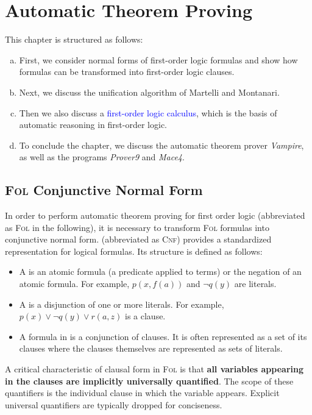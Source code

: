 \chapter{Automatic Theorem Proving}
This chapter is structured as follows:
\begin{enumerate}[(a)]
\item First, we consider normal forms of first-order logic formulas and show how formulas
      can be transformed into first-order logic clauses.
\item Next, we discuss the unification algorithm of Martelli and Montanari.
\item Then we also discuss a \textcolor{blue}{first-order logic calculus}, which is the basis
      of automatic reasoning in first-order logic.
\item To conclude the chapter, we discuss the automatic theorem prover \textsl{Vampire}, as well as
      the programs \textsl{Prover9} and \textsl{Mace4}.
\end{enumerate}

\section{\textsc{Fol} Conjunctive Normal Form}
In order to perform automatic theorem proving for first order logic (abbreviated as \textsc{Fol} in the
following), it is necessary to transform \textsc{Fol} formulas into conjunctive normal form.
 (abbreviated as \textsc{Cnf}) provides a standardized
representation for logical formulas. Its structure is defined as follows: 
\begin{itemize}
\item A  is an atomic formula (a predicate applied to terms) or the negation of an
      atomic formula. For example, $p(x, f(a))$ and $\neg q(y)$ are literals. 
\item A  is a disjunction of one or more literals. For example,
      $p(x) \lor \neg q(y) \lor r(a,z)$ is a clause. 
\item A formula in  is a conjunction of clauses. It is often represented as a set of its clauses
      where the clauses themselves are represented as sets of literals.
\end{itemize}
A critical characteristic of clausal form in \textsc{Fol} is that \textbf{all variables appearing in the clauses are implicitly universally quantified}. The scope of these quantifiers is the individual clause in which the variable appears. Explicit universal quantifiers are typically dropped for conciseness.

